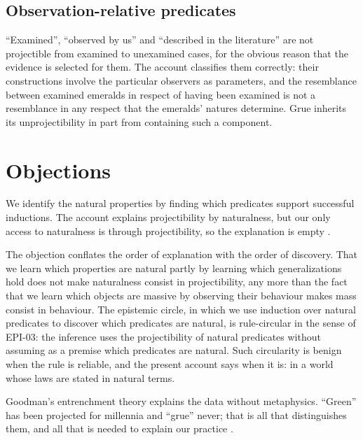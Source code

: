 \documentclass{situationist-preprint}
\begin{document}
\subsection{Observation-relative predicates}

\enquote{Examined}, \enquote{observed by us} and \enquote{described in the literature} are not projectible from examined to unexamined cases, for the obvious reason that the evidence is selected for them. The account classifies them correctly: their constructions involve the particular observers as parameters, and the resemblance between examined emeralds in respect of having been examined is not a resemblance in any respect that the emeralds' natures determine. Grue inherits its unprojectibility in part from containing such a component.

\section{Objections}

\begin{objection}[Circularity]
We identify the natural properties by finding which predicates support successful inductions. The account explains projectibility by naturalness, but our only access to naturalness is through projectibility, so the explanation is empty \citep{Quine1969}.
\end{objection}

\begin{reply}
The objection conflates the order of explanation with the order of discovery. That we learn which properties are natural partly by learning which generalizations hold does not make naturalness consist in projectibility, any more than the fact that we learn which objects are massive by observing their behaviour makes mass consist in behaviour. The epistemic circle, in which we use induction over natural predicates to discover which predicates are natural, is rule-circular in the sense of EPI-03: the inference uses the projectibility of natural predicates without assuming as a premise which predicates are natural. Such circularity is benign when the rule is reliable, and the present account says when it is: in a world whose laws are stated in natural terms.
\end{reply}

\begin{objection}
Goodman's entrenchment theory explains the data without metaphysics. \enquote{Green} has been projected for millennia and \enquote{grue} never; that is all that distinguishes them, and all that is needed to explain our practice \citep{Goodman1955}.
\end{objection}
\end{document}
